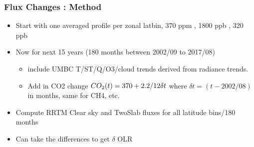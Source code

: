 \documentclass[10pt,t]{beamer}
\begin{document}
\begin{frame}
  \frametitle{Flux Changes : Method}
  \begin{itemize}
  \item Start with one averaged profile per zonal latbin, 370 ppm \cd, 1800 ppb \methane, 320 ppb \nitrous
  \item Now for next 15 years (180 months between 2002/09 to 2017/08)
  \begin{itemize}
    \item include  UMBC T/ST/Q/O3/cloud trends derived from radiance trends.
    \item Add in CO2 change $CO_2(t) = 370 + 2.2/12 \delta t$ where $\delta t = (t-2002/08)$ in months, same for CH4, etc.
  \end{itemize} 
  \item Compute RRTM Clear sky and TwoSlab fluxes for all latitude bins/180 months
  \item Can take the differences to get $\delta$ OLR
  \end{itemize}
\end{frame}
\end{document}
